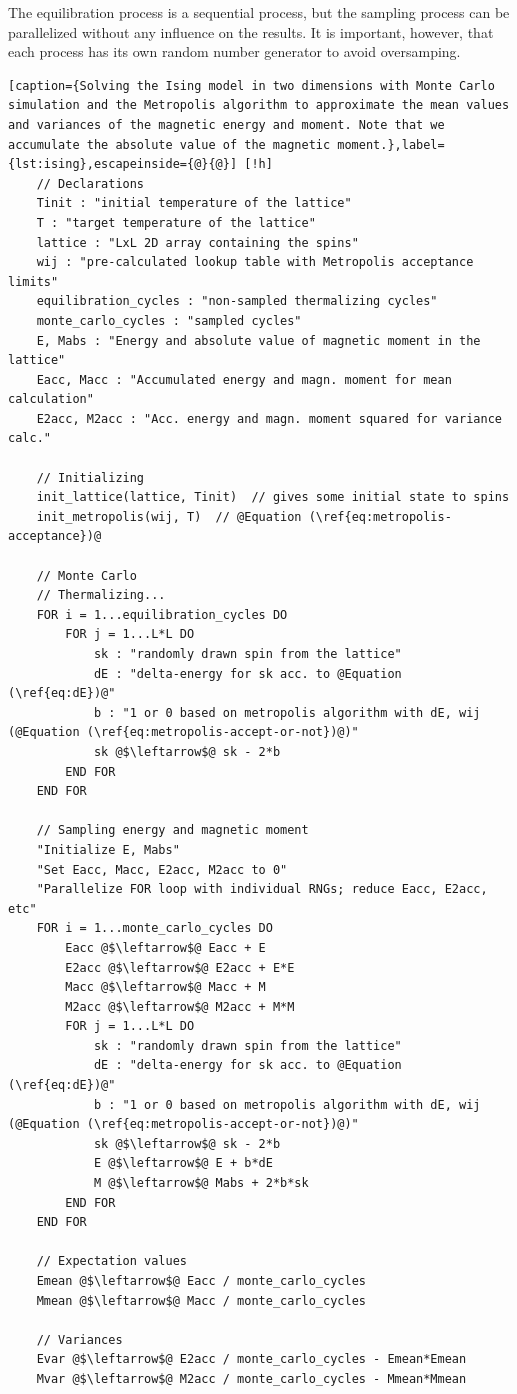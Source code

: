 \documentclass[]{article}
\begin{document}
The equilibration process is a sequential process, but the sampling process can be parallelized without any influence on the results. It is important, however, that each process has its own random number generator to avoid oversamping.

\begin{lstlisting}[caption={Solving the Ising model in two dimensions with Monte Carlo simulation and the Metropolis algorithm to approximate the mean values and variances of the magnetic energy and moment. Note that we accumulate the absolute value of the magnetic moment.},label={lst:ising},escapeinside={@}{@}] [!h]
	// Declarations
	Tinit : "initial temperature of the lattice"
	T : "target temperature of the lattice"	
	lattice : "LxL 2D array containing the spins"
	wij : "pre-calculated lookup table with Metropolis acceptance limits"
	equilibration_cycles : "non-sampled thermalizing cycles"
	monte_carlo_cycles : "sampled cycles"
	E, Mabs : "Energy and absolute value of magnetic moment in the lattice"
	Eacc, Macc : "Accumulated energy and magn. moment for mean calculation"
	E2acc, M2acc : "Acc. energy and magn. moment squared for variance calc."
	
	// Initializing
	init_lattice(lattice, Tinit)  // gives some initial state to spins
	init_metropolis(wij, T)  // @Equation (\ref{eq:metropolis-acceptance})@
	
	// Monte Carlo
	// Thermalizing...
	FOR i = 1...equilibration_cycles DO
		FOR j = 1...L*L DO
			sk : "randomly drawn spin from the lattice"
			dE : "delta-energy for sk acc. to @Equation (\ref{eq:dE})@"
			b : "1 or 0 based on metropolis algorithm with dE, wij (@Equation (\ref{eq:metropolis-accept-or-not})@)"
			sk @$\leftarrow$@ sk - 2*b
		END FOR
	END FOR
	
	// Sampling energy and magnetic moment
	"Initialize E, Mabs"
	"Set Eacc, Macc, E2acc, M2acc to 0"
	"Parallelize FOR loop with individual RNGs; reduce Eacc, E2acc, etc"
	FOR i = 1...monte_carlo_cycles DO
		Eacc @$\leftarrow$@ Eacc + E
		E2acc @$\leftarrow$@ E2acc + E*E
		Macc @$\leftarrow$@ Macc + M
		M2acc @$\leftarrow$@ M2acc + M*M		
		FOR j = 1...L*L DO
			sk : "randomly drawn spin from the lattice"
			dE : "delta-energy for sk acc. to @Equation (\ref{eq:dE})@"
			b : "1 or 0 based on metropolis algorithm with dE, wij (@Equation (\ref{eq:metropolis-accept-or-not})@)"
			sk @$\leftarrow$@ sk - 2*b
			E @$\leftarrow$@ E + b*dE
			M @$\leftarrow$@ Mabs + 2*b*sk
		END FOR
	END FOR	
	
	// Expectation values
	Emean @$\leftarrow$@ Eacc / monte_carlo_cycles
	Mmean @$\leftarrow$@ Macc / monte_carlo_cycles

	// Variances
	Evar @$\leftarrow$@ E2acc / monte_carlo_cycles - Emean*Emean
	Mvar @$\leftarrow$@ M2acc / monte_carlo_cycles - Mmean*Mmean	
\end{lstlisting}
\end{document}
